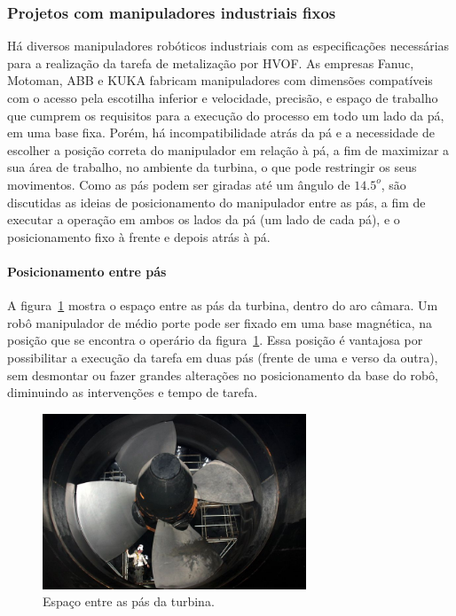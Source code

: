 \subsubsection{Projetos com manipuladores industriais fixos}\label{proj_manip}
Há diversos manipuladores robóticos industriais com as especificações
necessárias para a realização da tarefa de metalização por HVOF. As empresas
Fanuc, Motoman, ABB e KUKA fabricam manipuladores com dimensões compatíveis com o
acesso pela escotilha inferior e velocidade, precisão, e espaço de trabalho que
cumprem os requisitos para a execução do processo em todo um lado da pá, em uma
base fixa. Porém, há incompatibilidade atrás da pá e a necessidade de escolher a
posição correta do manipulador em relação à pá, a fim de maximizar a sua área de trabalho, no ambiente da
turbina, o que pode restringir os seus movimentos.
Como as pás podem ser giradas até um ângulo de $14.5^o$, são discutidas as ideias de posicionamento
do manipulador entre as pás, a fim de executar a operação em ambos os lados da
pá (um lado de cada pá), e o posicionamento fixo à frente e depois atrás à pá.

\paragraph{Posicionamento entre pás}

A figura~\ref{fig::andaime} mostra o espaço entre as pás da turbina, dentro do
aro câmara. Um robô manipulador de médio porte pode ser fixado em uma base
magnética, na posição que se encontra o operário da figura~\ref{fig::andaime}.
Essa posição é vantajosa por possibilitar a execução da tarefa em duas pás
(frente de uma e verso da outra), sem desmontar ou fazer grandes alterações no
posicionamento da base do robô, diminuindo as intervenções e tempo de tarefa.
 
\begin{figure}[h!]
\centering
\includegraphics[width=0.7\textwidth]{figs/andaime.jpg}
\caption{Espaço entre as pás da turbina.}
\label{fig::andaime}
\end{figure}

